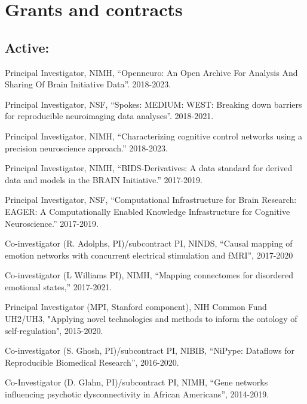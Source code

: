 \documentclass[10pt, letterpaper]{article}
\begin{document}
\section*{Grants and contracts}
\noindent
\subsection*{Active:} 

Principal Investigator, NIMH, ``Openneuro: An Open Archive For Analysis And Sharing Of Brain Initiative Data''.  2018-2023.   \vspace{2mm}

Principal Investigator, NSF, ``Spokes: MEDIUM: WEST: Breaking down barriers for reproducible neuroimaging data analyses''.  2018-2021.    \vspace{2mm}

Principal Investigator, NIMH, ``Characterizing cognitive control networks using a precision neuroscience approach.'' 2018-2023.  \vspace{2mm}
  
Principal Investigator, NIMH, ``BIDS-Derivatives: A data standard for derived data and models in the BRAIN Initiative.'' 2017-2019. \vspace{2mm}

Principal Investigator, NSF, ``Computational Infrastructure for Brain Research: EAGER: A Computationally Enabled Knowledge Infrastructure for Cognitive Neuroscience.''  2017-2019.  \vspace{2mm}

Co-investigator (R. Adolphs, PI)/subcontract PI, NINDS, ``Causal mapping of emotion networks with concurrent electrical stimulation and fMRI'', 2017-2020  \vspace{2mm}

Co-investigator (L Williams PI), NIMH, ``Mapping connectomes for disordered emotional states,'' 2017-2021.   \vspace{2mm}

Principal Investigator (MPI, Stanford component), NIH Common Fund UH2/UH3, "Applying novel technologies and methods to inform the ontology of self-regulation", 2015-2020.   \vspace{2mm}

Co-investigator (S. Ghosh, PI)/subcontract PI, NIBIB, ``NiPype: Dataflows for Reproducible Biomedical Research'', 2016-2020.    \vspace{2mm}

Co-Investigator (D. Glahn, PI)/subcontract PI, NIMH, ``Gene networks influencing psychotic dysconnectivity in African Americans'', 2014-2019. \vspace{2mm}
\end{document}
